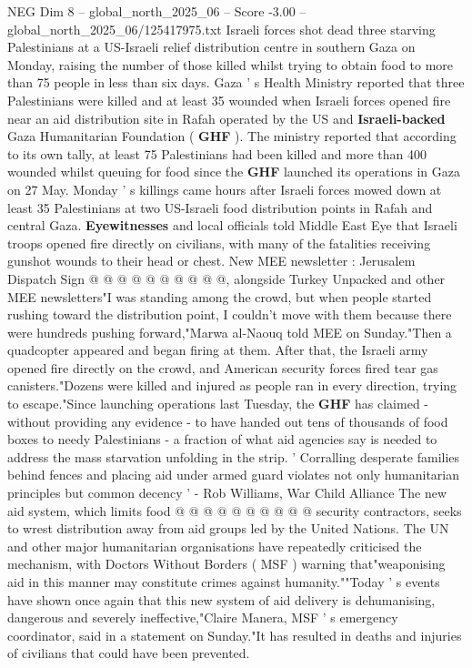 \begin{textsample}{NEG Dim 8 – global\_north\_2025\_06 – Score -3.00 – global\_north\_2025\_06/125417975.txt}  \label{ex:f8_neg_028}
Israeli forces shot dead three starving Palestinians at a US-Israeli relief distribution centre in southern Gaza on Monday, raising the number of those killed whilst trying to obtain food to more than 75 people in less than six days.
Gaza ' s Health Ministry reported that three Palestinians were killed and at least 35 wounded when Israeli forces opened fire near an aid distribution site in Rafah operated by the US and \textbf{Israeli-backed} Gaza Humanitarian Foundation ( \textbf{GHF} ).
The ministry reported that according to its own tally, at least 75 Palestinians had been killed and more than 400 wounded whilst queuing for food since the \textbf{GHF} launched its operations in Gaza on 27 May.
Monday ' s killings came hours after Israeli forces mowed down at least 35 Palestinians at two US-Israeli food distribution points in Rafah and central Gaza. \textbf{Eyewitnesses} and local officials told Middle East Eye that Israeli troops opened fire directly on civilians, with many of the fatalities receiving gunshot wounds to their head or chest.
New MEE newsletter : Jerusalem Dispatch Sign @ @ @ @ @ @ @ @ @ @, alongside Turkey Unpacked and other MEE newsletters"I was standing among the crowd, but when people started rushing toward the distribution point, I couldn't move with them because there were hundreds pushing forward,"Marwa al-Naouq told MEE on Sunday."Then a quadcopter appeared and began firing at them.
After that, the Israeli army opened fire directly on the crowd, and American security forces fired tear gas canisters."Dozens were killed and injured as people ran in every direction, trying to escape."Since launching operations last Tuesday, the \textbf{GHF} has claimed - without providing any evidence - to have handed out tens of thousands of food boxes to needy Palestinians - a fraction of what aid agencies say is needed to address the mass starvation unfolding in the strip. ' Corralling desperate families behind fences and placing aid under armed guard violates not only humanitarian principles but common decency ' - Rob Williams, War Child Alliance The new aid system, which limits food @ @ @ @ @ @ @ @ @ @ security contractors, seeks to wrest distribution away from aid groups led by the United Nations.
The UN and other major humanitarian organisations have repeatedly criticised the mechanism, with Doctors Without Borders ( MSF ) warning that"weaponising aid in this manner may constitute crimes against humanity.""Today ' s events have shown once again that this new system of aid delivery is dehumanising, dangerous and severely ineffective,"Claire Manera, MSF ' s emergency coordinator, said in a statement on Sunday."It has resulted in deaths and injuries of civilians that could have been prevented.

\end{textsample}
